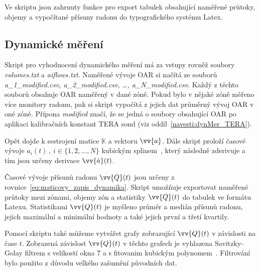 Ve skriptu jsou zahrnuty funkce pro export tabulek obsahující naměřené průtoky, objemy a vypočítané přísuny radonu do typografického systému Latex.

\subsection{Dynamické měření}
Skript pro vyhodnocení dynamického měření má za vstupy rovněž soubory \emph{volumes.txt} a \emph{aiflows.txt}. Naměřené vývoje OAR si načítá ze souborů \emph{a\_1\_modified.csv, a\_2\_modified.csv, \ldots, a\_N\_modified.csv}. Každý z těchto souborů obsahuje OAR naměřený v dané zóně. Pokud bylo v nějaké zóně měřeno více monitory radonu, pak si skript vypočítá z jejich dat průměrný vývoj OAR v oné zóně. Přípona \emph{modified} značí, že se jedná o soubory obsahující OAR po aplikaci kalibračních konstant TERA sond (viz oddíl~\ref{navesti:dynMer_TERA}).

Opět dojde k sestrojení matice $\mathbb{K}$ a vektoru $\vv{a}$. Dále skript proloží časové vývoje $a_i(t)\,,\ i\in\{1,2,\dots,N\}$ kubickým splinem~\cite{spline}, který následně zderivuje a tím jsou určeny derivace $\vv{\dot{a}}(t)$.

Časové vývoje přísunů radonu $\vv{Q}(t)$ jsou určeny z rovnice~\eqref{eq:maticovy_zapis_dynamika}. Skript umožňuje exportovat naměřené průtoky mezi zónami, objemy zón a statistiky $\vv{Q}(t)$ do tabulek ve formátu Latexu. Statistikami $\vv{Q}(t)$ je myšleno průměr a medián přísunů radonu, jejich maximální a minimální hodnoty a také jejich první a třetí kvartily. 

Pomocí skriptu také můžeme vytvářet grafy zobrazující $\vv{Q}(t)$ v závislosti na čase $t$. Zobrazená závislost  $\vv{Q}(t)$ v těchto grafech je vyhlazena Savitzky-Golay filtrem s velikostí okna 7 a s fitovanim kubickým polynomem~\cite{savgol}. Filtrování bylo použito z důvodu velkého zašumění původních dat. 

